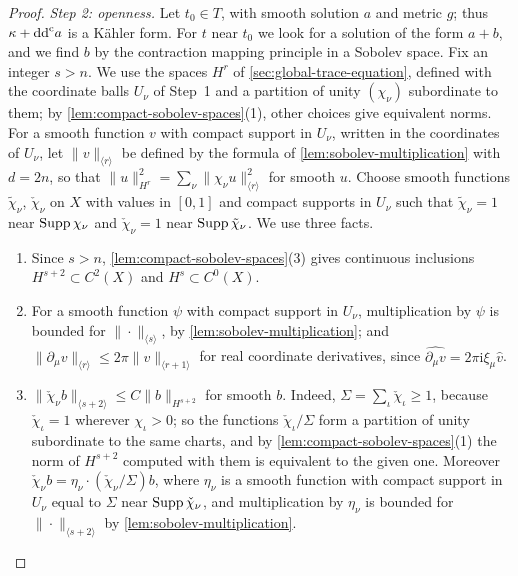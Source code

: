 \begin{proof}
\emph{Step 2: openness.} Let $t_0\in T$, with smooth solution $a$ and metric $g$; thus $\kappa+\mathrm{dd}^{\mathrm{c}} a$ is a K\"ahler form. For $t$ near $t_0$ we look for a solution of the form $a+b$, and we find $b$ by the contraction mapping principle in a Sobolev space. Fix an integer $s>n$. We use the spaces $H^r$ of \cref{sec:global-trace-equation}, defined with the coordinate balls $U_\nu$ of Step~1 and a partition of unity $(\chi_\nu)$ subordinate to them; by \cref{lem:compact-sobolev-spaces}(1), other choices give equivalent norms. For a smooth function $v$ with compact support in $U_\nu$, written in the coordinates of $U_\nu$, let $\|v\|_{\langle r\rangle}$ be defined by the formula of \cref{lem:sobolev-multiplication} with $d=2n$, so that $\|u\|_{H^r}^2=\sum_\nu\|\chi_\nu u\|_{\langle r\rangle}^2$ for smooth $u$. Choose smooth functions $\tilde\chi_\nu$, $\check\chi_\nu$ on $X$ with values in $[0,1]$ and compact supports in $U_\nu$ such that $\tilde\chi_\nu=1$ near $\operatorname{Supp}\chi_\nu$ and $\check\chi_\nu=1$ near $\operatorname{Supp}\tilde\chi_\nu$. We use three facts.
\begin{enumerate}
\item[(i)] Since $s>n$, \cref{lem:compact-sobolev-spaces}(3) gives continuous inclusions $H^{s+2}\subset C^2(X)$ and $H^s\subset C^0(X)$.
\item[(ii)] For a smooth function $\psi$ with compact support in $U_\nu$, multiplication by $\psi$ is bounded for $\|\cdot\|_{\langle s\rangle}$, by \cref{lem:sobolev-multiplication}; and $\|\partial_\mu v\|_{\langle r\rangle}\leq2\pi\|v\|_{\langle r+1\rangle}$ for real coordinate derivatives, since $\widehat{\partial_\mu v}=2\pi\mathrm i\xi_\mu\widehat v$.
\item[(iii)] $\|\check\chi_\nu b\|_{\langle s+2\rangle}\leq C\|b\|_{H^{s+2}}$ for smooth $b$. Indeed, $\Sigma=\sum_\iota\check\chi_\iota\geq1$, because $\check\chi_\iota=1$ wherever $\chi_\iota>0$; so the functions $\check\chi_\iota/\Sigma$ form a partition of unity subordinate to the same charts, and by \cref{lem:compact-sobolev-spaces}(1) the norm of $H^{s+2}$ computed with them is equivalent to the given one. Moreover $\check\chi_\nu b=\eta_\nu\cdot(\check\chi_\nu/\Sigma)b$, where $\eta_\nu$ is a smooth function with compact support in $U_\nu$ equal to $\Sigma$ near $\operatorname{Supp}\check\chi_\nu$, and multiplication by $\eta_\nu$ is bounded for $\|\cdot\|_{\langle s+2\rangle}$ by \cref{lem:sobolev-multiplication}.
\end{enumerate}


\end{proof}
